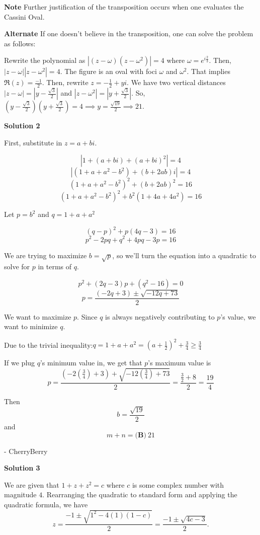 \begin{enumerate}
 \textbf{Note} Further justification of the transposition occurs when one evaluates the Cassini Oval.

 \textbf{Alternate} If one doesn't believe in the transposition, one can solve the problem as follows:

 Rewrite the polynomial as $|(z-\omega)(z-\omega^2)| = 4$ where $\omega = e^{i \frac{2}{3}}$. Then, $|z-\omega||z-\omega^2| = 4$. The figure is an oval with foci $\omega$ and $\omega^2$. That implies $\Re(z) = \frac{-1}{2}$. Then, rewrite $z = -\frac{1}{2} + yi$. We have two vertical distances $|z - \omega| = |y-\frac{\sqrt{3}}{2}|$ and $|z - \omega^2| = |y + \frac{\sqrt{3}}{2}|$. So, $(y - \frac{\sqrt{3}}{2})(y + \frac{\sqrt{3}}{2}) = 4 \implies y = \frac{\sqrt{19}}{2} \implies \boxed{21}$.

 



\textbf{Solution 2}

First, substitute in $z=a+bi$.

 
 \[|1+(a+bi)+(a+bi)^2|=4\]
 \[|(1+a+a^2-b^2)+ (b+2ab)i|=4\]
 \[(1+a+a^2-b^2)^2+ (b+2ab)^2=16\]
 \[(1+a+a^2-b^2)^2+ b^2(1+4a+4a^2)=16\]

 Let $p=b^2$ and $q=1+a+a^2$

 \[(q-p)^2+ p(4q-3)=16\]
 \[p^2-2pq+q^2   + 4pq -3p=16\]

 We are trying to maximize $b=\sqrt p$, so we'll turn the equation into a quadratic to solve for $p$ in terms of $q$.

 
 \[p^2+(2q-3)p+(q^2-16)=0\]
 \[p=\frac{(-2q+3)\pm \sqrt{-12q+73}}{2}\]

 We want to maximize $p$. Since $q$ is always negatively contributing to $p$'s value, we want to minimize $q$.

 Due to the trivial inequality:$q=1+a+a^2=(a+\frac 12)^2+\frac{3}4 \geq \frac{3}4$ 

 If we plug $q$'s minimum value in, we get that $p$'s maximum value is
 \[p=\frac{(-2(\frac 34)+3)+ \sqrt{-12(\frac 34)+73}}{2}=\frac{\frac 32+ 8}{2}=\frac{19}{4}\]

 Then
 \[b=\frac{\sqrt{19}}{2}\]and
 \[m+n=\boxed{\textbf{(B)}~21}\]

 - CherryBerry

 



\textbf{Solution 3}

We are given that $1+z+z^2=c$ where $c$ is some complex number with magnitude $4$. Rearranging the quadratic to standard form and applying the quadratic formula, we have
 \[z=\frac{-1\pm \sqrt{1^2-4(1)(1-c)}}{2}=\frac{-1\pm\sqrt{4c-3}}{2}.\]


\end{enumerate}
